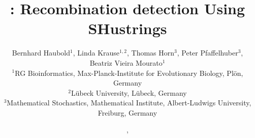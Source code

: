 \documentclass{article}
\begin{document}
\pagestyle{noweb}

\title{: Recombination detection Using SHustrings}
\author{Bernhard Haubold$^1$, Linda Krause$^{1,2}$, Thomas Horn$^3$, Peter
  Pfaffelhuber$^3$, \\Beatriz Vieira Mourato$^1$\\
\small $^1$RG Bioinformatics, Max-Planck-Institute for Evolutionary Biology, Pl\"on,
Germany\\
\small $^2$L\"ubeck University, L\"ubeck, Germany\\
\small $^3$Mathematical Stochastics, Mathematical Institute,
Albert-Ludwigs University, Freiburg, Germany}
\date{\!\!, }
\maketitle




\end{document}
